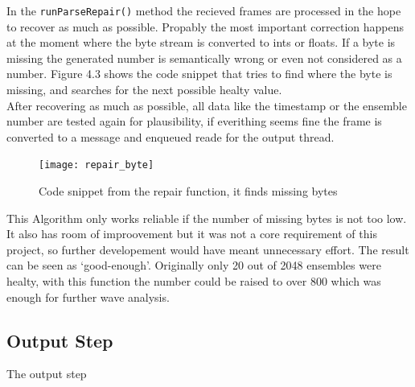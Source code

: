 In the \texttt{runParseRepair()} method the recieved frames are processed in the hope to recover as much as possible. Propably the most important correction happens at the moment where the byte stream is converted to ints or floats. If a byte is missing the generated number is semantically wrong or even not considered as a number. Figure 4.3 shows the code snippet that tries to find where the byte is missing, and searches for the next possible healty value.\\
After recovering as much as possible, all data like the timestamp or the ensemble number are tested again for plausibility, if everithing seems fine the frame is converted to a message and enqueued reade for the output thread.
\begin{figure}[h]
\centering
      \texttt{[image: repair\_byte]}
        \caption{Code snippet from the repair function, it finds missing bytes}
\end{figure}
This Algorithm only works reliable if the number of missing bytes is not too low. It also has room of improovement but it was not a core requirement of this project, so further developement would have meant unnecessary effort. The result can be seen as `good-enough'. Originally only 20 out of 2048 ensembles were healty, with this function the number could be raised to over 800 which was enough for further wave analysis.

\subsection{Output Step}
The output step 



 